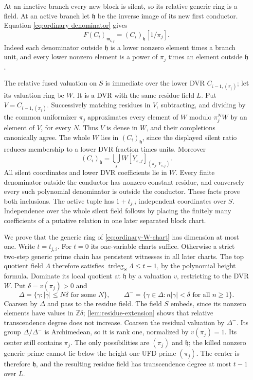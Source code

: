 \documentclass[11pt,reqno]{amsart}
\numberwithin{equation}{section}
\theoremstyle{plain}
\theoremstyle{definition}
\theoremstyle{remark}
\begin{document}
At an inactive branch every new block is silent, so its relative
generic ring is a field. At an active branch let
\(\mathfrak h\) be the inverse image of its new first conductor.
Equation \eqref{eq:ordinary-denominator} gives
\begin{equation}\label{eq:ordinary-first-conductor}
 F(C_i)_{\mathfrak m_{i,j}}
       =(C_i)_{\mathfrak h}[1/\pi_j].
\end{equation}
Indeed each denominator outside \(\mathfrak h\) is a lower
nonzero element times a branch unit, and every lower nonzero
element is a power of \(\pi_j\) times an element outside
\(\mathfrak h\).

The relative fused valuation on \(S\) is immediate over the
lower DVR \(C_{i-1,(\pi_j)}\); let its valuation ring be \(W\).
It is a DVR with the same residue field \(L\).
Put \(V=C_{i-1,(\pi_j)}\). Successively matching residues in
\(V\), subtracting, and dividing by the common uniformizer
\(\pi_j\) approximates every element of \(W\) modulo
\(\pi_j^N W\) by an element of \(V\), for every \(N\).
Thus \(V\) is dense in \(W\), and their completions canonically agree.
The whole \(W\) lies in \((C_i)_{\mathfrak h}\), since the
displayed silent ratio reduces membership to a lower DVR
fraction times units. Moreover
\begin{equation}\label{eq:ordinary-W-chart}
 (C_i)_{\mathfrak h}
       =\bigcup_s W[Y_{s,j}]_{(\pi_j,Y_{s,j})}.
\end{equation}
All silent coordinates and lower DVR coefficients lie in \(W\).
Every finite denominator outside the conductor has nonzero
constant residue, and conversely every such polynomial
denominator is outside the conductor. These facts prove both
inclusions. The active tuple has \(1+t_{j,i}\) independent
coordinates over \(S\). Independence over the whole silent
field follows by placing the finitely many coefficients of a
putative relation in one later separated block chart.

We prove that the generic ring of \eqref{eq:ordinary-W-chart}
has dimension at most one. Write \(t=t_{j,i}\). For \(t=0\)
its one-variable charts suffice. Otherwise a strict two-step
generic prime chain has persistent witnesses in all later
charts. The top quotient field \(\Lambda\) therefore satisfies
\(\operatorname{trdeg}_{S}\Lambda\le t-1\), by the polynomial
height formula. Dominate its local quotient at \(\mathfrak h\)
by a valuation \(v\), restricting to the DVR \(W\).
Put \(\delta=v(\pi_j)>0\) and
\[
 \Delta=\{\gamma:|\gamma|\le N\delta\text{ for some }N\},\qquad
 \Delta^-=\{\gamma\in\Delta:n|\gamma|<\delta\text{ for all }n\ge1\}.
\]
Coarsen by \(\Delta\) and pass to the residue field. The field
\(S\) embeds, since its nonzero elements have values in
\(\mathbb Z\delta\); \cref{lem:residue-extension} shows that
relative transcendence degree does not increase. Coarsen the
residual valuation by \(\Delta^-\). Its group
\(\Delta/\Delta^-\) is Archimedean, so it is rank one, normalized
by \(v(\pi_j)=1\). Its center still contains \(\pi_j\).
The only possibilities are \((\pi_j)\) and \(\mathfrak h\);
the killed nonzero generic prime cannot lie below the
height-one UFD prime \((\pi_j)\). The center is therefore
\(\mathfrak h\), and the resulting residue field has
transcendence degree at most \(t-1\) over \(L\).
\end{document}

